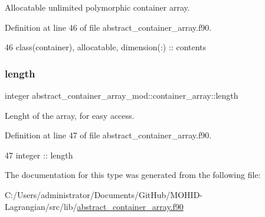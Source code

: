 Allocatable unlimited polymorphic container array. 



Definition at line 46 of file abstract\+\_\+container\+\_\+array.\+f90.


\begin{DoxyCode}
46         \textcolor{keywordtype}{class}(container), \textcolor{keywordtype}{allocatable}, \textcolor{keywordtype}{dimension(:)} :: contents
\end{DoxyCode}
\mbox{\label{structabstract__container__array__mod_1_1container__array_a0ec81671d521b7a118a83e79f1d40b56}} 
\subsubsection{\texorpdfstring{length}{length}}
{\footnotesize\ttfamily integer abstract\+\_\+container\+\_\+array\+\_\+mod\+::container\+\_\+array\+::length\hspace{0.3cm}{\ttfamily [private]}}



Lenght of the array, for easy access. 



Definition at line 47 of file abstract\+\_\+container\+\_\+array.\+f90.


\begin{DoxyCode}
47         \textcolor{keywordtype}{integer} :: length
\end{DoxyCode}


The documentation for this type was generated from the following file\+:\begin{DoxyCompactItemize}
\item 
C\+:/\+Users/administrator/\+Documents/\+Git\+Hub/\+M\+O\+H\+I\+D-\/\+Lagrangian/src/lib/\mbox{\hyperlink{abstract__container__array_8f90}{abstract\+\_\+container\+\_\+array.\+f90}}\end{DoxyCompactItemize}
